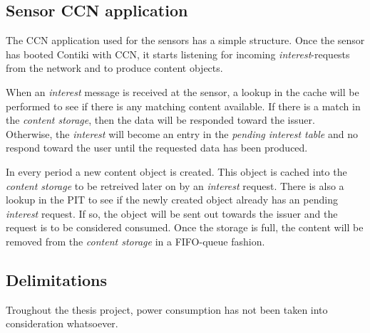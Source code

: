 \subsection{Sensor CCN application}
The CCN application used for the sensors has a simple structure. Once the sensor has booted Contiki with CCN, it starts listening for incoming \textit{interest}-requests from the network and to produce content objects.

When an \textit{interest} message is received at the sensor, a lookup in the cache will be performed to see if there is any matching content available. If there is a match in the \textit{content storage}, then the data will be responded toward the issuer. Otherwise, the \textit{interest} will become an entry in the \textit{pending interest table} and no respond toward the user until the requested data has been produced.

In every period a new content object is created. This object is cached into the \textit{content storage} to be retreived later on by an \textit{interest} request. There is also a lookup in the PIT to see if the newly created object already has an pending \textit{interest} request. If so, the object will be sent out towards the issuer and the request is to be considered consumed. Once the storage is full, the content will be removed from the \textit{content storage} in a FIFO-queue fashion.



\subsection{Delimitations}
Troughout the thesis project, power consumption has not been taken into consideration whatsoever. 




